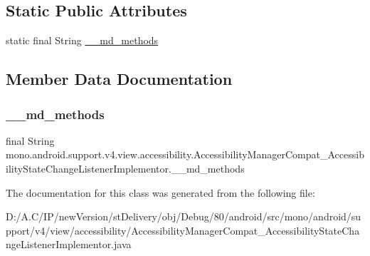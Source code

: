 \subsection*{Static Public Attributes}
\begin{DoxyCompactItemize}
\item 
static final String \hyperlink{classmono_1_1android_1_1support_1_1v4_1_1view_1_1accessibility_1_1_accessibility_manager_compat_18265d54b1862e339153b0dd9ae68d99_af97918afc32f2d74733ff3d398f908c0}{\+\_\+\+\_\+md\+\_\+methods}
\end{DoxyCompactItemize}


\subsection{Member Data Documentation}
\mbox{\label{classmono_1_1android_1_1support_1_1v4_1_1view_1_1accessibility_1_1_accessibility_manager_compat_18265d54b1862e339153b0dd9ae68d99_af97918afc32f2d74733ff3d398f908c0}} 
\subsubsection{\texorpdfstring{\+\_\+\+\_\+md\+\_\+methods}{\_\_md\_methods}}
{\footnotesize\ttfamily final String mono.\+android.\+support.\+v4.\+view.\+accessibility.\+Accessibility\+Manager\+Compat\+\_\+\+Accessibility\+State\+Change\+Listener\+Implementor.\+\_\+\+\_\+md\+\_\+methods\hspace{0.3cm}{\ttfamily [static]}}



The documentation for this class was generated from the following file\+:\begin{DoxyCompactItemize}
\item 
D\+:/\+A.\+C/\+I\+P/new\+Version/st\+Delivery/obj/\+Debug/80/android/src/mono/android/support/v4/view/accessibility/Accessibility\+Manager\+Compat\+\_\+\+Accessibility\+State\+Change\+Listener\+Implementor.\+java\end{DoxyCompactItemize}
